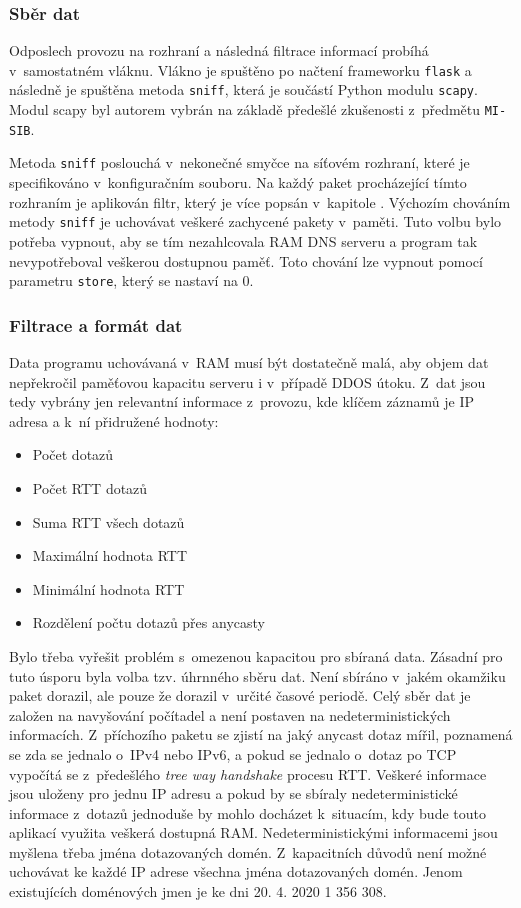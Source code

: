 \documentclass[thesis=M,czech]{src/FITthesis}[2019/12/23]
\begin{document}
\subsubsection{Sběr dat}
Odposlech provozu na rozhraní a následná filtrace informací probíhá v~samostatném vláknu. Vlákno je spuštěno po načtení frameworku \texttt{flask} a následně je spuštěna metoda \texttt{sniff}, která je součástí Python modulu \texttt{scapy}. Modul scapy byl autorem vybrán na základě předešlé zkušenosti z~předmětu \texttt{MI-SIB}.

Metoda \texttt{sniff} poslouchá v~nekonečné smyčce na síťovém rozhraní, které je specifikováno v~konfiguračním souboru. Na každý paket procházející tímto rozhraním je aplikován filtr, který je více popsán v~kapitole \textit{}. Výchozím chováním metody \texttt{sniff} je uchovávat veškeré zachycené pakety v~paměti. Tuto volbu bylo potřeba vypnout, aby se tím nezahlcovala RAM DNS serveru a program tak nevypotřeboval veškerou dostupnou paměť. Toto chování lze vypnout pomocí parametru \texttt{store}, který se nastaví na 0. 

 
\subsubsection{Filtrace a formát dat}
\label{sec:filter}
Data programu uchovávaná v~RAM musí být dostatečně malá, aby objem dat nepřekročil paměťovou kapacitu serveru i v~případě DDOS útoku. Z~dat jsou tedy vybrány jen relevantní informace z~provozu, kde klíčem záznamů je IP adresa a k~ní přidružené hodnoty:
\begin{itemize}
	\item Počet dotazů
	\item Počet RTT dotazů
	\item Suma RTT všech dotazů
	\item Maximální hodnota RTT
	\item Minimální hodnota RTT
	\item Rozdělení počtu dotazů přes anycasty
\end{itemize}


Bylo třeba vyřešit problém s~omezenou kapacitou pro sbíraná data. Zásadní pro tuto úsporu byla volba tzv. úhrnného sběru dat. Není sbíráno v~jakém okamžiku paket dorazil, ale pouze že dorazil v~určité časové periodě. Celý sběr dat je založen na navyšování počítadel a není postaven na nedeterministických informacích. Z~příchozího paketu se zjistí na jaký anycast dotaz mířil, poznamená se zda se jednalo o~IPv4 nebo IPv6, a pokud se jednalo o~dotaz po TCP vypočítá se z~předešlého \textit{tree way handshake} procesu RTT. Veškeré informace jsou uloženy pro jednu IP adresu a pokud by se sbíraly nedeterministické informace z~dotazů jednoduše by mohlo docházet k~situacím, kdy bude touto aplikací využita veškerá dostupná RAM. Nedeterministickými informacemi jsou myšlena třeba jména dotazovaných domén. Z~kapacitních důvodů není možné uchovávat ke každé IP adrese všechna jména dotazovaných domén. Jenom existujících doménových jmen je ke dni 20. 4. 2020 1 356 308. \cite{cznic-statistics}
\end{document}
